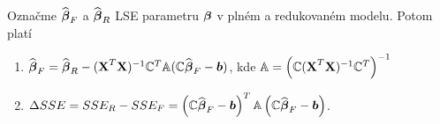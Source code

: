 \newcommand{\bb}{\boldsymbol{b}}
\newcommand{\yb}{\boldsymbol{y}}
\newcommand{\lambdab}{\boldsymbol{\lambda}}
\newcommand{\xtx}{(\X^T \X)^{-1}}
\newcommand{\parcialni}[2]{\frac{\partial #1}{\partial #2}}

\begin{lemma}
	Označme $\widehat{\boldsymbol{\beta}}_F$ a $\widehat{\boldsymbol{\beta}}_R$ LSE parametru $\boldsymbol{\beta}$ v plném a redukovaném modelu. Potom platí
	\begin{enumerate}
		\item $\wbetab_F = \wbetab_R - (\X^T \X)^{-1} \C^T \Am (\C \wbetab_F - \bb)$, kde $\mathbb{A} = \left( \mathbb{C} (\textbf{X}^T \textbf{X})^{-1} \mathbb{C}^T \right)^{-1}$
		\item $\Delta SSE = SSE_R - SSE_F = \left( \C \wbetab_F - \bb \right)^T \Am \left( \C \wbetab_F - \bb \right)$.
	\end{enumerate}
\end{lemma}

